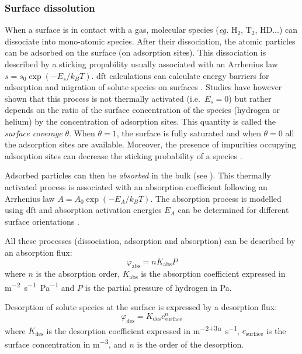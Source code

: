 \subsubsection{Surface dissolution}

When a surface is in contact with a gas, molecular species (\textit{eg.} $\text{H}_2$, $\text{T}_2$, $\text{HD}$...) can dissociate into mono-atomic species.
After their dissociation, the atomic particles can be adsorbed on the surface (on adsorption sites).
This dissociation is described by a sticking propability usually associated with an Arrhenius law $s = s_0 \exp{(-E_s/k_B T)}$.
\gls{dft} calculations can calculate energy barriers for adsorption and migration of solute species on surfaces .
Studies have however shown that this process is not thermally activated (i.e.\ $E_s=0$)  but rather depends on the ratio of the surface concentration of the species (hydrogen or helium) by the concentration of adsorption sites.
This quantity is called the \textit{surface coverage} $\theta$. 
When $\theta = 1$, the surface is fully saturated and when $\theta = 0$ all the adsorption sites are available.
Moreover, the presence of impurities occupying adsorption sites can decrease the sticking probability of a species .

Adsorbed particles can then be \textit{absorbed} in the bulk (see ).
This thermally activated process is associated with an absorption coefficient following an Arrhenius law $A=A_0 \exp{(-E_A/k_B T)}$.
The absorption process is modelled using \gls{dft} and absorption activation energies $E_A$ can be determined for different surface orientations .

All these processes (dissociation, adsorption and absorption) can be described by an absorption flux:
\begin{equation}
    \varphi_\mathrm{abs} = n K_\mathrm{abs} P
\end{equation}
where $n$ is the absorption order, $K_\mathrm{abs}$ is the absorption coefficient expressed in \si{m^{-2}.s^{-1}.Pa^{-1}} and $P$ is the partial pressure of hydrogen in \si{Pa}.

Desorption of solute species at the surface is expressed by a desorption flux:
\begin{equation}
    \varphi_\mathrm{des} = K_\mathrm{des} c_\mathrm{surface}^n
\end{equation}
where $K_\mathrm{des}$ is the desorption coefficient expressed in \si{m^{-2+3n}.s^{-1}}, $c_\mathrm{surface}$ is the surface concentration in \si{m^{-3}}, and $n$ is the order of the desorption.


